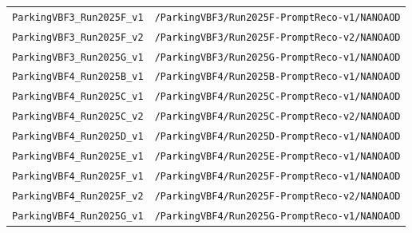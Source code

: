 \begin{longtable}{@{}>{\RaggedRight\arraybackslash}p{} >{\RaggedRight\arraybackslash}p{}@{}}
\addlinespace[2pt]
\texttt{ParkingVBF3\_\allowbreak{}Run2025F\_\allowbreak{}v1} & \texttt{/\allowbreak{}ParkingVBF3/\allowbreak{}Run2025F-\allowbreak{}PromptReco-\allowbreak{}v1/\allowbreak{}NANOAOD} \\
\addlinespace[2pt]
\texttt{ParkingVBF3\_\allowbreak{}Run2025F\_\allowbreak{}v2} & \texttt{/\allowbreak{}ParkingVBF3/\allowbreak{}Run2025F-\allowbreak{}PromptReco-\allowbreak{}v2/\allowbreak{}NANOAOD} \\
\addlinespace[2pt]
\texttt{ParkingVBF3\_\allowbreak{}Run2025G\_\allowbreak{}v1} & \texttt{/\allowbreak{}ParkingVBF3/\allowbreak{}Run2025G-\allowbreak{}PromptReco-\allowbreak{}v1/\allowbreak{}NANOAOD} \\
\addlinespace[2pt]
\texttt{ParkingVBF4\_\allowbreak{}Run2025B\_\allowbreak{}v1} & \texttt{/\allowbreak{}ParkingVBF4/\allowbreak{}Run2025B-\allowbreak{}PromptReco-\allowbreak{}v1/\allowbreak{}NANOAOD} \\
\addlinespace[2pt]
\texttt{ParkingVBF4\_\allowbreak{}Run2025C\_\allowbreak{}v1} & \texttt{/\allowbreak{}ParkingVBF4/\allowbreak{}Run2025C-\allowbreak{}PromptReco-\allowbreak{}v1/\allowbreak{}NANOAOD} \\
\addlinespace[2pt]
\texttt{ParkingVBF4\_\allowbreak{}Run2025C\_\allowbreak{}v2} & \texttt{/\allowbreak{}ParkingVBF4/\allowbreak{}Run2025C-\allowbreak{}PromptReco-\allowbreak{}v2/\allowbreak{}NANOAOD} \\
\addlinespace[2pt]
\texttt{ParkingVBF4\_\allowbreak{}Run2025D\_\allowbreak{}v1} & \texttt{/\allowbreak{}ParkingVBF4/\allowbreak{}Run2025D-\allowbreak{}PromptReco-\allowbreak{}v1/\allowbreak{}NANOAOD} \\
\addlinespace[2pt]
\texttt{ParkingVBF4\_\allowbreak{}Run2025E\_\allowbreak{}v1} & \texttt{/\allowbreak{}ParkingVBF4/\allowbreak{}Run2025E-\allowbreak{}PromptReco-\allowbreak{}v1/\allowbreak{}NANOAOD} \\
\addlinespace[2pt]
\texttt{ParkingVBF4\_\allowbreak{}Run2025F\_\allowbreak{}v1} & \texttt{/\allowbreak{}ParkingVBF4/\allowbreak{}Run2025F-\allowbreak{}PromptReco-\allowbreak{}v1/\allowbreak{}NANOAOD} \\
\addlinespace[2pt]
\texttt{ParkingVBF4\_\allowbreak{}Run2025F\_\allowbreak{}v2} & \texttt{/\allowbreak{}ParkingVBF4/\allowbreak{}Run2025F-\allowbreak{}PromptReco-\allowbreak{}v2/\allowbreak{}NANOAOD} \\
\addlinespace[2pt]
\texttt{ParkingVBF4\_\allowbreak{}Run2025G\_\allowbreak{}v1} & \texttt{/\allowbreak{}ParkingVBF4/\allowbreak{}Run2025G-\allowbreak{}PromptReco-\allowbreak{}v1/\allowbreak{}NANOAOD} \\

\end{longtable}
